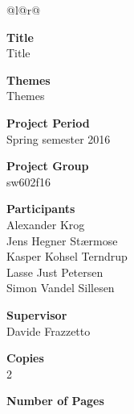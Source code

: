 
\begin{nopagebreak}
{\begin{center}
    \begin{tabular*}{\textwidth}{@{}l@{\extracolsep{\fill}}r@{}}
        \\
        \begin{minipage}[t]{0.49\textwidth}
            \textbf{Title}\\
            Title
            
            \bigskip
            \textbf{Themes}\\
            Themes

            \bigskip
            \textbf{Project Period}\\
            Spring semester 2016

            \bigskip
            \textbf{Project Group}\\
            sw602f16

            \bigskip
            \textbf{Participants}\\
            Alexander Krog\\
            Jens Hegner Stærmose\\
            Kasper Kohsel Terndrup\\
            Lasse Just Petersen\\
            Simon Vandel Sillesen
            
            \bigskip
            \textbf{Supervisor}\\
            Davide Frazzetto
            
            \bigskip
            \textbf{Copies}\\
            2 %

            \bigskip
            \textbf{Number of Pages}\\
            \pageref{LastPage}


\end{minipage}
\end{tabular*}
\end{center}}
\end{nopagebreak}
